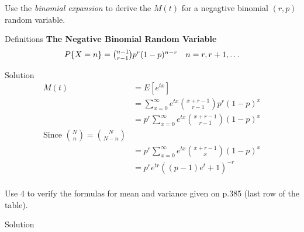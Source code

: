\documentclass{article}
\begin{document}
\begin{spacing}{1.1}
\newpage
\begin{homeworkProblem}
  Use the \emph{binomial expansion} to derive the $M(t)$ for a negagtive
  binomial $(r, p)$ random variable.
  \begin{homeworkSection}{Definitions}
    {\bf The Negative Binomial Random Variable}
    \[\begin{array}{l l} P\{X = n\} = {n - 1 \choose r - 1} p^r (1 - p)^{n - r} & n = r, r + 1, \dots \end{array}\]
  \end{homeworkSection}
  \begin{homeworkSection}{Solution}
    \begin{align*}
      M(t) &= E[ e^{tx}]\\
      &= \sum\limits_{x = 0}^{\infty} e^{t x} {x + r - 1 \choose r - 1} p^r (1 - p)^{x}\\
      &= p^r \sum\limits_{x = 0}^{\infty} e^{t x} {x + r - 1 \choose r - 1} (1 - p)^{x}\\
      \text{Since ${N \choose n} = {N \choose N - n}$}\\
      &= p^r \sum\limits_{x = 0}^{\infty} e^{t x} {x + r - 1 \choose x} (1 - p)^{x}\\
      &= p^r e^{t r}( (p - 1) e^t + 1)^{-r}\\
    \end{align*}
  \end{homeworkSection}
\end{homeworkProblem}
\newpage
\begin{homeworkProblem}
  Use 4 to verify the formulas for mean and variance given on p.385 
  (last row of the table).
  \begin{homeworkSection}{Solution}
    
  \end{homeworkSection}
\end{homeworkProblem}
  
\end{spacing}
\end{document}
